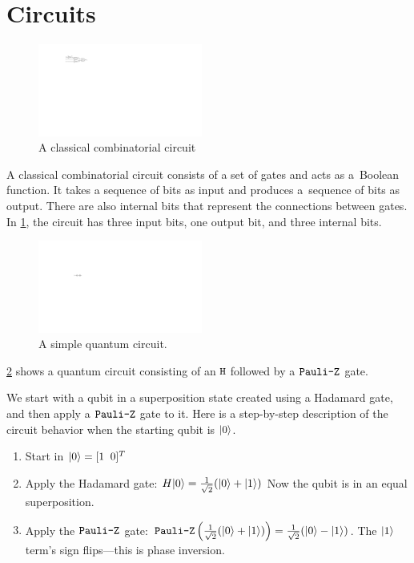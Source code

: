 \section{Circuits} 
\begin{figure}
\includegraphics[width=0.48\textwidth]{Figures/HWCircuits/DigitalCircuit} 
\caption{A classical combinatorial circuit}
\label{classicalcirc:fig}
\end{figure}
A classical combinatorial circuit consists of a set of gates and acts as a~Boolean function. It takes a sequence of bits as input and produces a~sequence of bits as output. There are also internal bits that represent the connections between gates. In \cref{classicalcirc:fig}, the circuit has three input bits, one output bit, and three internal bits.
%
\begin{figure}
\includegraphics[width=0.48\textwidth]{Figures/Circuits/HZ} 
\caption{A simple quantum circuit.}
\label{HZ:fig}
\end{figure}
%
\cref{HZ:fig} shows a quantum circuit consisting of an $\mathtt{H}$ followed by a $\texttt{Pauli-Z}$ gate.


We start with a qubit in a superposition state created using a Hadamard gate, and then apply a $\texttt{Pauli-Z}$ gate to it.
%
Here is a step-by-step description of the circuit behavior when the starting qubit is $|0\rangle$.
%
\begin{enumerate}
\item Start in $|0\rangle = [1 \;\; 0]^T$
\item Apply the Hadamard gate: 
$H|0\rangle = \frac{1}{\sqrt{2}}(|0\rangle + |1\rangle)$
%
Now the qubit is in an equal superposition.
\item Apply the $\texttt{Pauli-Z}$ gate: 
$\texttt{Pauli-Z}\left(\frac{1}{\sqrt{2}}(|0\rangle + |1\rangle)\right) = \frac{1}{\sqrt{2}}(|0\rangle - |1\rangle)$.
%
The $|1\rangle$ term’s sign flips—this is phase inversion.
\end{enumerate}


